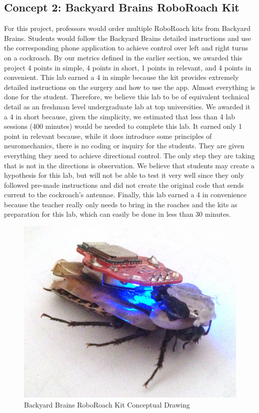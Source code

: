 \documentclass{article}
\begin{document}
\subsection{Concept 2: Backyard Brains RoboRoach Kit}
\par For this project, professors would order multiple RoboRoach kits from Backyard Brains. Students would follow the Backyard Brains detailed instructions and use the corresponding phone application to achieve control over left and right turns on a cockroach. By our metrics defined in the earlier section, we awarded this project 4 points in simple, 4 points in short, 1 points in relevant, and 4 points in convenient. This lab earned a 4 in simple because the kit provides extremely detailed instructions on the surgery and how to use the app. Almost everything is done for the student. Therefore, we believe this lab to be of equivalent technical detail as an freshman level undergraduate lab at top universities. We awarded it a 4 in short because, given the simplicity, we estimated that less than 4 lab sessions (400 minutes) would be needed to complete this lab. It earned only 1 point in relevant because, while it does introduce some principles of neuromechanics, there is no coding or inquiry for the students. They are given everything they need to achieve directional control. The only step they are taking that is not in the directions is observation. We believe that students may create a hypothesis for this lab, but will not be able to test it very well since they only followed pre-made instructions and did not create the original code that sends current to the cockroach's antennae. Finally, this lab earned a 4 in convenience because the teacher really only needs to bring in the roaches and the kits as preparation for this lab, which can easily be done in less than 30 minutes.

\begin{figure}[ht!]
\centering
\includegraphics[scale=0.15]{roboroach.png}
\caption{Backyard Brains RoboRoach Kit Conceptual Drawing}
\label{fig:concept2}
\end{figure}
\end{document}
